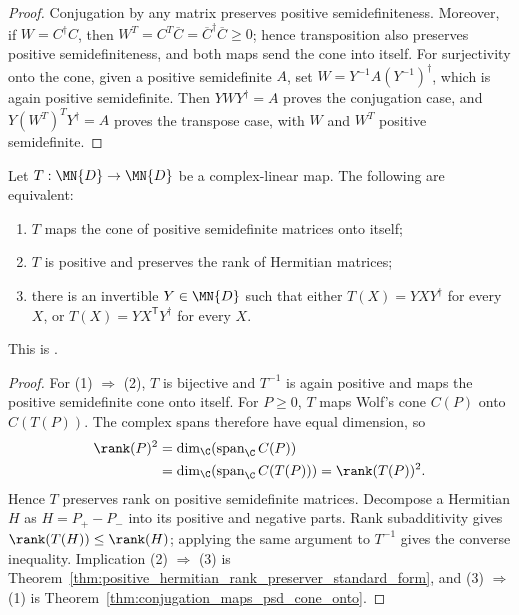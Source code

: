 \begin{proof}\leanok
    Conjugation by any matrix preserves positive semidefiniteness. Moreover,
    if $W=C^\dagger C$, then
    $W^T=C^T\overline C=\overline C^\dagger\overline C\geq0$;
    hence transposition also preserves positive semidefiniteness, and both maps
    send the cone into itself. For surjectivity onto the cone, given
    a positive semidefinite $A$, set
    $W=Y^{-1}A(Y^{-1})^\dagger$, which is again positive semidefinite. Then
    $YWY^\dagger=A$ proves the conjugation case, and
    $Y(W^T)^TY^\dagger=A$ proves the transpose case, with $W$ and $W^T$
    positive semidefinite.
\end{proof}

\begin{theorem}
    \label{thm:wolf_prop_3_6}
    \leanok
    Let $T:\MN{D}\to\MN{D}$ be a complex-linear map. The following are
    equivalent:
    \begin{enumerate}
        \item $T$ maps the cone of positive semidefinite matrices onto itself;
        \item $T$ is positive and preserves the rank of Hermitian matrices;
        \item there is an invertible $Y\in\MN{D}$ such that either
              $T(X)=YXY^\dagger$ for every $X$, or
              $T(X)=YX^{\mathsf T}Y^\dagger$ for every $X$.
    \end{enumerate}
    This is \cite[Proposition~3.6]{Wolf2012Quantum}.
\end{theorem}

\begin{proof}\leanok
    For (1) $\Rightarrow$ (2), $T$ is bijective and $T^{-1}$ is again positive
    and maps the positive semidefinite cone onto itself. For $P\geq0$, $T$ maps
    Wolf's cone $C(P)$ onto $C(T(P))$. The complex spans therefore have equal
    dimension, so
    \begin{align}
        \rank(P)^2
        &=\dim_{\C}\!\left(\operatorname{span}_{\C}C(P)\right)\\
        &=\dim_{\C}\!\left(\operatorname{span}_{\C}C(T(P))\right)
        =\rank(T(P))^2.
        \notag
    \end{align}
    Hence $T$ preserves rank on positive semidefinite matrices. Decompose a
    Hermitian $H$ as $H=P_+-P_-$ into its positive and negative parts. Rank
    subadditivity gives $\rank(T(H))\leq\rank(H)$; applying the same argument to
    $T^{-1}$ gives the converse inequality. Implication (2) $\Rightarrow$ (3)
    is Theorem~\ref{thm:positive_hermitian_rank_preserver_standard_form}, and
    (3) $\Rightarrow$ (1) is
    Theorem~\ref{thm:conjugation_maps_psd_cone_onto}.
\end{proof}

